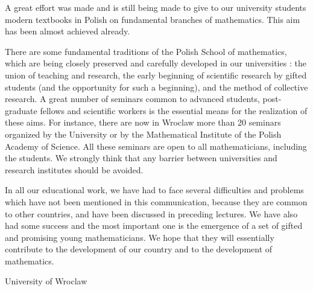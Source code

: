 A great effort was made and is still being made to give to our university students modern textbooks in Polish on fundamental branches of mathematics. This aim has been almost achieved already.

There are some fundamental traditions of the Polish School of mathematics, which are being closely preserved and carefully developed in our universities : the union of teaching and research, the early beginning of scientific research by gifted students (and the opportunity for such a beginning), and the method of collective research. A great number of seminars common to advanced students, post-graduate fellows and scientific workers is the essential means for the realization of these aims. For instance, there are now in Wroclaw more than 20 seminars organized by the University or by the Mathematical Institute of the Polish Academy of Science. All these seminars are open to all mathematicians, including the students. We strongly think that any barrier between universities and research institutes should be avoided.

In all our educational work, we have had to face several difficulties and problems which have not been mentioned in this communication, because they are common to other countries, and have been discussed in preceding lectures. We have also had some success and the most important one is the emergence of a set of gifted and promising young mathematicians. We hope that they will essentially contribute to the development of our country and to the development of mathematics.

\bigskip
\medskip
{\fontsize{9pt}{11pt}\selectfont 
University of Wroclaw
}\relax
